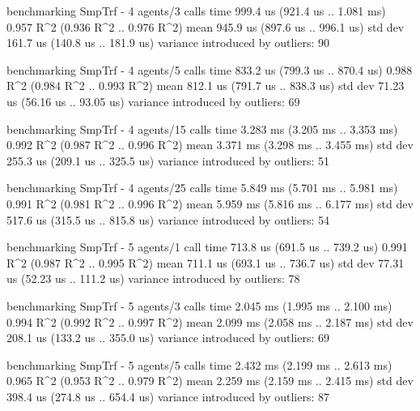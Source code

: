 \begin{showCode}
    benchmarking SmpTrf - 4 agents/3 calls
    time                 999.4 us   (921.4 us .. 1.081 ms)
                         0.957 R^2   (0.936 R^2 .. 0.976 R^2)
    mean                 945.9 us   (897.6 us .. 996.1 us)
    std dev              161.7 us   (140.8 us .. 181.9 us)
    variance introduced by outliers: 90%

    benchmarking SmpTrf - 4 agents/5 calls
    time                 833.2 us   (799.3 us .. 870.4 us)
                         0.988 R^2   (0.984 R^2 .. 0.993 R^2)
    mean                 812.1 us   (791.7 us .. 838.3 us)
    std dev              71.23 us   (56.16 us .. 93.05 us)
    variance introduced by outliers: 69%

    benchmarking SmpTrf - 4 agents/15 calls
    time                 3.283 ms   (3.205 ms .. 3.353 ms)
                         0.992 R^2   (0.987 R^2 .. 0.996 R^2)
    mean                 3.371 ms   (3.298 ms .. 3.455 ms)
    std dev              255.3 us   (209.1 us .. 325.5 us)
    variance introduced by outliers: 51%

    benchmarking SmpTrf - 4 agents/25 calls
    time                 5.849 ms   (5.701 ms .. 5.981 ms)
                         0.991 R^2   (0.981 R^2 .. 0.996 R^2)
    mean                 5.959 ms   (5.816 ms .. 6.177 ms)
    std dev              517.6 us   (315.5 us .. 815.8 us)
    variance introduced by outliers: 54%

    benchmarking SmpTrf - 5 agents/1 call
    time                 713.8 us   (691.5 us .. 739.2 us)
                         0.991 R^2   (0.987 R^2 .. 0.995 R^2)
    mean                 711.1 us   (693.1 us .. 736.7 us)
    std dev              77.31 us   (52.23 us .. 111.2 us)
    variance introduced by outliers: 78%

    benchmarking SmpTrf - 5 agents/3 calls
    time                 2.045 ms   (1.995 ms .. 2.100 ms)
                         0.994 R^2   (0.992 R^2 .. 0.997 R^2)
    mean                 2.099 ms   (2.058 ms .. 2.187 ms)
    std dev              208.1 us   (133.2 us .. 355.0 us)
    variance introduced by outliers: 69%

    benchmarking SmpTrf - 5 agents/5 calls
    time                 2.432 ms   (2.199 ms .. 2.613 ms)
                         0.965 R^2   (0.953 R^2 .. 0.979 R^2)
    mean                 2.259 ms   (2.159 ms .. 2.415 ms)
    std dev              398.4 us   (274.8 us .. 654.4 us)
    variance introduced by outliers: 87%


\end{showCode}
